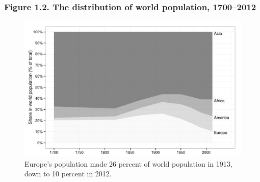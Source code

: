 \documentclass[t]{beamer}\usepackage[]{graphicx}\usepackage[]{color}
\newenvironment{knitrout}{}{} %
\begin{document}
\begin{frame}[label=Figure_1_2]
\frametitle{Figure 1.2. The distribution of world population, 1700--2012}
\begin{figure}[t]
\begin{minipage}[b]{\textwidth}
\centering
\begin{knitrout}\footnotesize
{}\color{fgcolor}

{\centering \includegraphics[width=1\linewidth]{figures/bw/Figure_1_2} 

}



\end{knitrout}
\caption{Europe's population made 26 percent of world population in 1913, down to 10 percent in 2012.}
\end{minipage}
\end{figure}
\end{frame}
\end{document}
